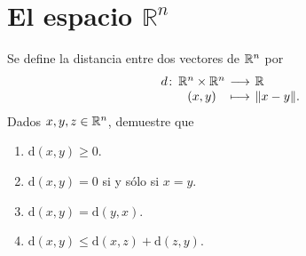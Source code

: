 \documentclass[a4,11pt]{aleph-notas}
\begin{document}
\section{El espacio $\mathbb{R}^n$}

\begin{ejer}
    Se define la distancia entre dos vectores de $\mathbb{R}^n$ por
    \[
        \funcion{d}{\R^n \times \R^n}{\R}{(x,y)}{\|x - y\|.}
    \]
    Dados $x,y,z\in\mathbb{R}^n$, demuestre que
    \begin{enumerate}
        \item 
        $\text{d}(x,y)\geq 0$.
        \item
        $\text{d}(x,y) = 0$ si y sólo si $x=y$.
        \item
        $\text{d}(x,y) = \text{d}(y,x)$.
        \item
        $\text{d}(x,y) \leq \text{d}(x,z) + \text{d}(z,y)$.
    \end{enumerate}
\end{ejer}
\end{document}
